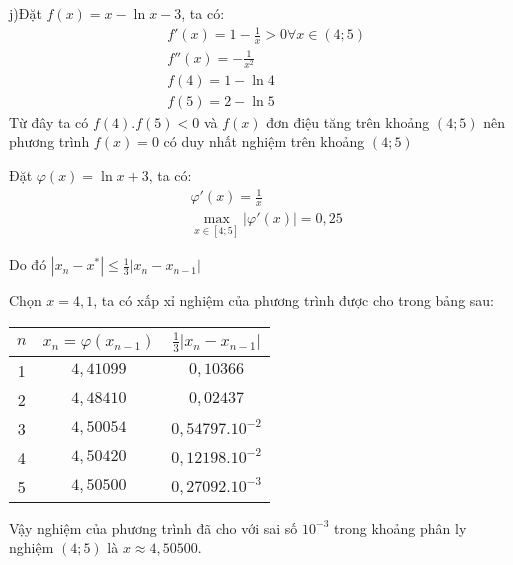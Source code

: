 j)Đặt $f(x)=x-\ln x-3$, ta có:
\begin{align*}
	&f'(x)=1-\frac{1}{x}>0 \forall x\in (4;5)\\
	&f''(x)=-\frac{1}{x^2}\\
	&f(4)=1-\ln 4\\
	&f(5)=2-\ln 5
\end{align*}
Từ đây ta có $f(4).f(5)<0$ và $f(x)$ đơn điệu tăng trên khoảng $(4;5)$ nên phương trình $f(x)=0$ có duy nhất nghiệm trên khoảng $(4;5)$\par
Đặt $\varphi (x)=\ln x+3$, ta có:
\begin{align*}
	&\varphi'(x)=\frac{1}{x}\\
	&\max_{x\in [4;5]} |\varphi'(x)| = 0,25
\end{align*}

Do đó $|x_n-x^*|\leqslant \frac{1}{3}|x_n-x_{n-1}|$\par
Chọn $x=4,1$, ta có xấp xỉ nghiệm của phương trình được cho trong bảng sau:
\begin{center}
\begin{tabular}{|c|c|c|}\hline
$n$&$x_n=\varphi(x_{n-1})$&$\frac{1}{3}|x_n-x_{n-1}|$\\ \hline
1&$4,41099$&$0,10366$\\ \hline
2&$4,48410$&$0,02437$\\ \hline
3&$4,50054$&$0,54797.10^{-2}$\\ \hline
4&$4,50420$&$0,12198.10^{-2}$\\ \hline
5&$4,50500$&$0,27092.10^{-3}$\\ \hline
\end{tabular}
\end{center}

Vậy nghiệm của phương trình đã cho với sai số $10^{-3}$ trong khoảng phân ly nghiệm $(4;5)$ là $x\approx 4,50500$.\par
